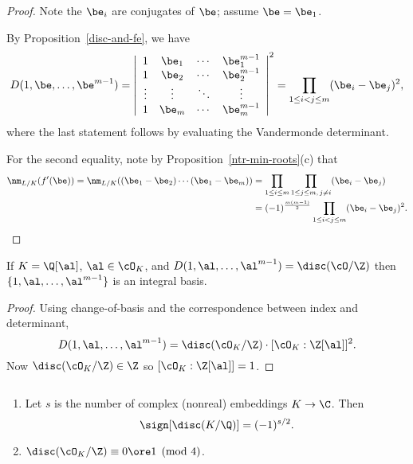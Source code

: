 \begin{proof}
Note the $\be_i$ are conjugates of $\be$; assume $\be=\be_1$.

By Proposition~\ref{disc-and-fe}, we have
\[
D(1,\be,\ldots, \be^{m-1})=
\left|\begin{array}{cccc}
1 & \be_{1} & \cdots & \be_1^{m-1}\\
1 & \be_{2} & \cdots & \be_{2}^{m-1}\\
\vdots & \vdots & \ddots & \vdots\\
1 & \be_{m} & \cdots & \be_{m}^{m-1}\end{array}\right|^{2}
=
\prod_{1\leq i<j\leq m}(\be_i-\be_j)^2,
\]
where the last statement follows by evaluating the Vandermonde determinant.

For the second equality, note by Proposition~\ref{ntr-min-roots}(c) that
\begin{align*}
\nm_{L/K}(f'(\be))=\nm_{L/K}((\be_1-\be_2)\cdots (\be_1-\be_m))&=\prod_{1\le i\le m}\prod_{1\le j\le m,\,j\ne i}
(\be_i-\be_j)\\
&=(-1)^{\frac{m(m-1)}2}
\prod_{1\leq i<j\leq m}(\be_i-\be_j)^2.
\end{align*}
\end{proof}
\begin{pr}%
If $K=\Q[\al]$, $\al\in \cO_K$, and $D(1,\al,\ldots, \al^{m-1})=\disc(\cO/\Z)$ then $\{1,\al,\ldots, \al^{m-1}\}$ is an integral basis.
\end{pr}
\begin{proof}
Using change-of-basis and the correspondence between index and determinant,
\[
D(1,\al,\ldots, \al^{m-1})=\disc(\cO_K/\Z)\cdot [\cO_K:\Z[\al]]^2.
\]
Now $\disc(\cO_K/\Z)\in \Z$ so $[\cO_K:\Z[\al]]=1$.
\end{proof}
\begin{thm}$\,$
\begin{enumerate}
\item Let $s$ is the number of %
complex (nonreal) embeddings $K\to \C$. 
Then
\[\sign[\disc(K/\Q)]=(-1)^{s/2}.\] 
\item $\disc(\cO_K/\Z)\equiv 0\ore 1\pmod 4$.
\end{enumerate}
\end{thm}
